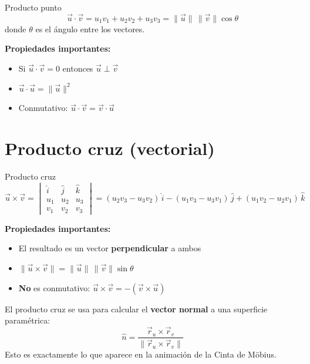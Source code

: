 \documentclass[12pt]{article}
\begin{document}
\begin{definicion}{Producto punto}
  \[
    \vec{u} \cdot \vec{v} = u_1 v_1 + u_2 v_2 + u_3 v_3 
                          = \|\vec{u}\|\,\|\vec{v}\|\cos\theta
  \]
  donde $\theta$ es el ángulo entre los vectores.
\end{definicion}

\textbf{Propiedades importantes:}
\begin{itemize}
  \item Si $\vec{u} \cdot \vec{v} = 0$ entonces $\vec{u} \perp \vec{v}$
  \item $\vec{u} \cdot \vec{u} = \|\vec{u}\|^2$
  \item Conmutativo: $\vec{u} \cdot \vec{v} = \vec{v} \cdot \vec{u}$
\end{itemize}

\section{Producto cruz (vectorial)}

\begin{definicion}{Producto cruz}
  \[
    \vec{u} \times \vec{v} = 
    \begin{vmatrix}
      \hat{i} & \hat{j} & \hat{k} \\
      u_1 & u_2 & u_3 \\
      v_1 & v_2 & v_3
    \end{vmatrix}
    = (u_2 v_3 - u_3 v_2)\,\hat{i} 
    - (u_1 v_3 - u_3 v_1)\,\hat{j} 
    + (u_1 v_2 - u_2 v_1)\,\hat{k}
  \]
\end{definicion}

\textbf{Propiedades importantes:}
\begin{itemize}
  \item El resultado es un vector \textbf{perpendicular} a ambos
  \item $\|\vec{u} \times \vec{v}\| = \|\vec{u}\|\,\|\vec{v}\|\sin\theta$
  \item \textbf{No} es conmutativo: $\vec{u} \times \vec{v} = -(\vec{v} \times \vec{u})$
\end{itemize}

\bigskip
\begin{nota}
  El producto cruz se usa para calcular el \textbf{vector normal} a una 
  superficie paramétrica:
  \[
    \hat{n} = \frac{\vec{r}_u \times \vec{r}_v}{\|\vec{r}_u \times \vec{r}_v\|}
  \]
  Esto es exactamente lo que aparece en la animación de la Cinta de Möbius.
\end{nota}
\end{document}
